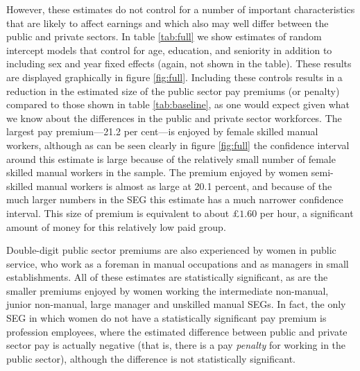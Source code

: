 \documentclass[a4paper,11pt,titlepage]{article}
\begin{document}
However, these estimates do not control for a number of important characteristics
that are likely to affect earnings and which also may well differ between the public and
private sectors. In table \ref{tab:full} we show estimates of random intercept models that control
for age, education, and seniority in addition to including sex and year fixed effects (again, not shown in the table). These results are displayed graphically in figure \ref{fig:full}. Including these controls results in a reduction in the estimated size of the public sector pay premiums (or penalty) compared to those shown in table \ref{tab:baseline}, as one would expect given what we know about the differences in the public and private sector workforces.  The largest pay premium---21.2 per cent---is enjoyed by female skilled manual workers, although as can be seen clearly in figure \ref{fig:full} the confidence interval around this estimate is large because of the relatively small number of female skilled manual workers in the sample. The premium enjoyed by women semi-skilled manual workers is almost as large at 20.1 percent, and because of the much larger numbers in the SEG this estimate has a much narrower confidence interval.  This size of premium is equivalent to about \pounds $1.60$ per hour, a significant amount of money for this relatively low paid group.

Double-digit public sector premiums are also experienced by women in public service, who work as a foreman in manual occupations and as managers in small establishments.  All of these estimates are statistically significant, as are the smaller premiums enjoyed by women working the intermediate non-manual, junior non-manual, large manager and unskilled manual SEGs.  In fact, the only SEG in which women do not have a statistically significant pay premium is profession employees, where the estimated difference between public and private sector pay is actually negative (that is, there is a pay \emph{penalty} for working in the public sector), although the difference is not statistically significant.
\end{document}
